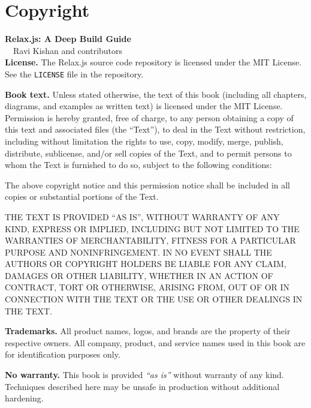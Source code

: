 \chapter*{Copyright}

\noindent\textbf{Relax.js: A Deep Build Guide}\\
\noindent\textcopyright\ \the\year\ Ravi Kishan and contributors\\

\vspace{0.8em}
\noindent\textbf{License.} The Relax.js source code repository is licensed under the MIT License.
See the \texttt{LICENSE} file in the repository.

\vspace{0.8em}
\noindent\textbf{Book text.} Unless stated otherwise, the text of this book (including all chapters, diagrams, and examples as written text) is licensed under the MIT License.
Permission is hereby granted, free of charge, to any person obtaining a copy of this text and associated files (the \textquotedblleft Text\textquotedblright),
to deal in the Text without restriction, including without limitation the rights to use, copy, modify, merge, publish, distribute, sublicense,
and/or sell copies of the Text, and to permit persons to whom the Text is furnished to do so, subject to the following conditions:

\vspace{0.4em}
\noindent The above copyright notice and this permission notice shall be included in all copies or substantial portions of the Text.

\vspace{0.4em}
\noindent THE TEXT IS PROVIDED \textquotedblleft AS IS\textquotedblright, WITHOUT WARRANTY OF ANY KIND, EXPRESS OR IMPLIED, INCLUDING BUT NOT LIMITED TO
THE WARRANTIES OF MERCHANTABILITY, FITNESS FOR A PARTICULAR PURPOSE AND NONINFRINGEMENT. IN NO EVENT SHALL THE AUTHORS OR COPYRIGHT HOLDERS BE LIABLE
FOR ANY CLAIM, DAMAGES OR OTHER LIABILITY, WHETHER IN AN ACTION OF CONTRACT, TORT OR OTHERWISE, ARISING FROM, OUT OF OR IN CONNECTION WITH THE TEXT
OR THE USE OR OTHER DEALINGS IN THE TEXT.

\vspace{0.8em}
\noindent\textbf{Trademarks.} All product names, logos, and brands are the property of their respective owners.
All company, product, and service names used in this book are for identification purposes only.

\vspace{0.8em}
\noindent\textbf{No warranty.} This book is provided \emph{\textquotedblleft as is\textquotedblright} without warranty of any kind.
Techniques described here may be unsafe in production without additional hardening.

